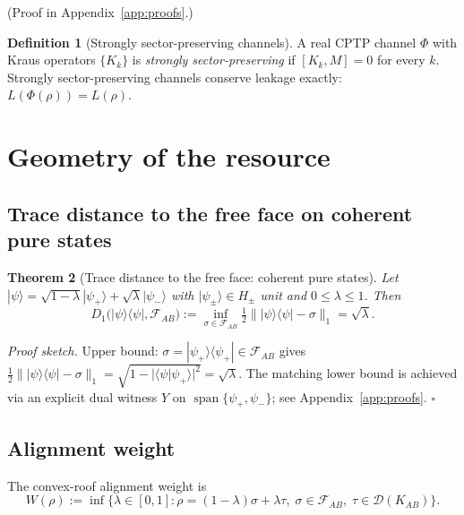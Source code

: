 \documentclass[a4paper,onecolumn,noarxiv]{quantumarticle}
\theoremstyle{plain}
\newtheorem{theorem}{Theorem}
\theoremstyle{definition}
\newtheorem{definition}[theorem]{Definition}
\theoremstyle{remark}
\newcommand{\KAB}{K_{AB}}
\newcommand{\Mop}{M}
\newcommand{\FAB}{\mathcal{F}_{AB}}
\newcommand{\Lleak}{L}
\begin{document}
(Proof in Appendix~\ref{app:proofs}.)

\begin{definition}[Strongly sector-preserving channels]
\label{def:sector-preserving}
A real CPTP channel $\Phi$ with Kraus operators $\{K_k\}$ is \emph{strongly
sector-preserving} if $[K_k,\Mop]=0$ for every $k$. Strongly sector-preserving
channels conserve leakage exactly: $\Lleak(\Phi(\rho))=\Lleak(\rho)$.
\end{definition}

\section{Geometry of the resource}
\label{sec:geometry}

\subsection{Trace distance to the free face on coherent pure states}

\begin{theorem}[Trace distance to the free face: coherent pure states]
\label{thm:tracedist}
Let $|\psi\rangle=\sqrt{1-\lambda}|\psi_+\rangle+\sqrt{\lambda}|\psi_-\rangle$ with
$|\psi_\pm\rangle\in H_\pm$ unit and $0\le\lambda\le 1$. Then
\begin{equation}
  D_1\bigl(|\psi\rangle\langle\psi|,\FAB\bigr)
  := \inf_{\sigma\in\FAB}\tfrac{1}{2}\bigl\||\psi\rangle\langle\psi|-\sigma\bigr\|_1
  = \sqrt{\lambda}.
\end{equation}
\end{theorem}

\emph{Proof sketch.} Upper bound: $\sigma=|\psi_+\rangle\langle\psi_+|\in\FAB$ gives
$\tfrac{1}{2}\||\psi\rangle\langle\psi|-\sigma\|_1
=\sqrt{1-|\langle\psi|\psi_+\rangle|^2}=\sqrt{\lambda}$. The matching lower bound is
achieved via an explicit dual witness $Y$ on $\operatorname{span}\{\psi_+,\psi_-\}$;
see Appendix~\ref{app:proofs}. \hfill$\square$

\subsection{Alignment weight}

The convex-roof alignment weight is
\begin{equation}
  W(\rho) := \inf\{\lambda\in[0,1] :
  \rho=(1-\lambda)\sigma+\lambda\tau,\;\sigma\in\FAB,\;\tau\in\mathcal{D}(\KAB)\}.
\end{equation}
\end{document}
